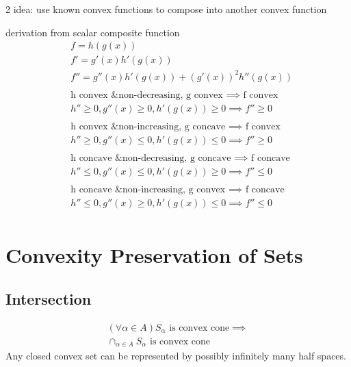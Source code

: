 \documentclass[8pt]{extarticle}
\begin{document}
\begin{multicols*}{2}
  idea: use known convex functions to compose into another convex function
  
  derivation from scalar composite function
  \begin{align*}
    &f=h(g(x))\\
    &f'=g'(x)h'(g(x))\\
    &f''=g''(x)h'(g(x)) + (g'(x))^2 h''(g(x))\\
    \\
    &\text{h convex \& non-decreasing, g convex } \implies \text{ f convex}\\
    &h'' \geq 0, g''(x) \geq 0, h'(g(x)) \geq 0 \implies f'' \geq 0\\
    \\
    &\text{h convex \& non-increasing, g concave } \implies \text{ f convex}\\
    &h'' \geq 0, g''(x) \leq 0, h'(g(x)) \leq 0 \implies f'' \geq 0\\
    \\
    &\text{h concave \& non-decreasing, g concave } \implies \text{ f concave}\\
    &h'' \leq 0, g''(x) \leq 0, h'(g(x)) \geq 0 \implies f'' \leq 0\\
    \\
    &\text{h concave \& non-increasing, g convex } \implies \text{ f concave}\\
    &h'' \leq 0, g''(x) \geq 0, h'(g(x)) \leq 0 \implies f'' \leq 0\\
  \end{align*}

  \vfill\null
  \columnbreak
  
  \section{Convexity Preservation of Sets}
  \subsection{Intersection}
  \begin{align*}
    (\forall \alpha \in A) S_{\alpha}\text{ is convex cone} \implies\\
    \cap_{\alpha \in A} S_{\alpha} \text{ is convex cone}
  \end{align*}
  Any closed convex set can be represented by possibly infinitely many half spaces.\\
  

\end{multicols*}
\end{document}
